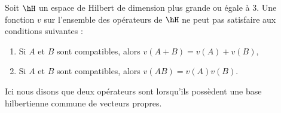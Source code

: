\begin{theorem}		\label{THOooRHHPooQbcDAe}
	Soit \( \hH\) un espace de Hilbert de dimension plus grande ou égale à \( 3\). Une fonction \( v\) sur l'ensemble des opérateurs de \( \hH\) ne peut pas satisfaire aux conditions suivantes :
	\begin{enumerate}
		\item
		      Si \( A\) et \( B\) sont compatibles, alors \( v(A+B)=v(A)+v(B)\),
		\item
		      Si \( A\) et \( B\) sont compatibles, alors \( v(AB)=v(A)v(B)\).
	\end{enumerate}
	Ici nous disons que deux opérateurs sont  lorsqu'ils possèdent une base hilbertienne commune de vecteurs propres.
\end{theorem}

